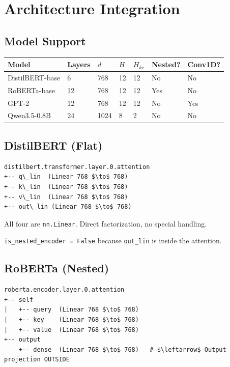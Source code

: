 
\section{Architecture Integration}

\subsection{Model Support}

\begin{table}[H]
\centering
\small
\begin{tabular}{lllllll}
\toprule
\textbf{Model} & \textbf{Layers} & \textbf{$d$} & \textbf{$H$} & \textbf{$H_{kv}$} & \textbf{Nested?} & \textbf{Conv1D?} \\
\midrule
DistilBERT-base & 6 & 768 & 12 & 12 & No & No \\
RoBERTa-base & 12 & 768 & 12 & 12 & Yes & No \\
GPT-2 & 12 & 768 & 12 & 12 & No & Yes \\
Qwen3.5-0.8B & 24 & 1024 & 8 & 2 & No & No \\
\bottomrule
\end{tabular}
\end{table}

\subsection{DistilBERT (Flat)}

\begin{lstlisting}
distilbert.transformer.layer.0.attention
+-- q\_lin  (Linear 768 $\to$ 768)
+-- k\_lin  (Linear 768 $\to$ 768)
+-- v\_lin  (Linear 768 $\to$ 768)
+-- out\_lin (Linear 768 $\to$ 768)
\end{lstlisting}

All four are \texttt{nn.Linear}. Direct factorization, no special handling.

\texttt{is\_nested\_encoder = False} because \texttt{out\_lin} is inside the attention.

\subsection{RoBERTa (Nested)}

\begin{lstlisting}
roberta.encoder.layer.0.attention
+-- self
|   +-- query  (Linear 768 $\to$ 768)
|   +-- key    (Linear 768 $\to$ 768)
|   +-- value  (Linear 768 $\to$ 768)
+-- output
    +-- dense  (Linear 768 $\to$ 768)   # $\leftarrow$ Output projection OUTSIDE
\end{lstlisting}

